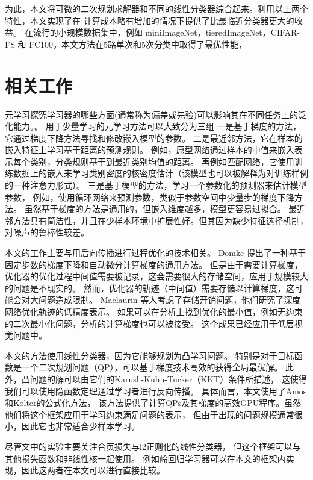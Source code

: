 为此，本文将可微的二次规划求解器\cite{amos2017optnet}和不同的线性分类器综合起来。利用以上两个特性，本文实现了在
计算成本略有增加的情况下提供了比最临近分类器更大的收益。
在流行的小规模数据集中，例如 miniImageNet\cite{vinyals2016matching,vilalta2002perspective}，tieredImageNet\cite{ren2018meta}，CIFAR-FS\cite{bertinetto2018meta} 和 FC100\cite{oreshkin2018tadam}，本文方法在5路单次和5次分类中取得了最优性能，

\chapter{相关工作}
元学习探究学习器的哪些方面(通常称为偏差或先验)可以影响其在不同任务上的泛化能力\cite{schmidhuber1987evolutionary,thrun1998lifelong,vilalta2002perspective}。。
用于少量学习的元学习方法可以大致分为三组
一是基于梯度的方法\cite{ravi2017optimization,finn2017model}，它通过梯度下降方法寻找和修改嵌入模型的参数。
二是最近邻方法\cite{vinyals2016matching,snell2017prototypical}，它在样本的嵌入特征上学习基于距离的预测规则。
例如，原型网络通过样本的中值来嵌入表示每个类别，分类规则基于到最近类别均值的距离\cite{snell2017prototypical}。
再例如匹配网络，它使用训练数据上的嵌入来学习类别密度的核密度估计（该模型也可以被解释为对训练样例的一种注意力形式）\cite{vinyals2016matching}。
三是基于模型的方法\cite{mishra2017simple,munkhdalai2018rapid}，学习一个参数化的预测器来估计模型参数，
例如，使用循环网络来预测参数，类似于参数空间中少量步的梯度下降方法。
虽然基于梯度的方法是通用的，但嵌入维度越多，模型更容易过拟合\cite{mishra2017simple,rusu2018meta}。
最近邻方法具有简洁性，并且在少样本环境中扩展性好。但其因为缺少特征选择机制，对噪声的鲁棒性较差。

本文的工作主要与用后向传播进行过程优化的技术相关。
Domke\cite{domke2012generic} 提出了一种基于固定步数的梯度下降和自动微分计算梯度的通用方法。
但是由于需要计算梯度，优化器的优化过程中间值需要被记录，这会需要很大的存储空间，应用于规模较大
的问题是不现实的。
然而，优化器的轨迹（中间值）需要存储以计算梯度，这可能会对大问题造成限制。
Maclaurin 等人考虑了存储开销问题\cite{maclaurin2015gradient}，他们研究了深度网络优化轨迹的低精度表示。
如果可以在分析上找到优化的最小值，例如无约束的二次最小化问题，分析的计算梯度也可以被接受。
这个成果已经应用于低层视觉问题中\cite{tappen2007learning,schmidt2014shrinkage}。

本文的方法使用线性分类器，因为它能够规划为凸学习问题。
特别是对于目标函数是一个二次规划问题（QP），可以基于梯度技术高效的获得全局最优解。
此外，凸问题的解可以由它们的Karush-Kuhn-Tucker（KKT）条件所描述，
这使得我们可以使用隐函数定理通过学习者\cite{krantz2002implicit}进行反向传播。
具体而言，本文使用了Amos和Kolter的公式化方法\cite{amos2017optnet}，
该方法提供了计算QPs及其梯度的高效GPU程序。虽然他们将这个框架应用于学习约束满足问题的表示，
但由于出现的问题规模通常很小，因此它也非常适合少样本学习。

尽管文中的实验主要关注合页损失与l2正则化的线性分类器，
但这个框架可以与其他损失函数和非线性核一起使用。
例如岭回归学习器可以在本文的框架内实现\cite{bertinetto2018meta}，因此这两者在本文可以进行直接比较。